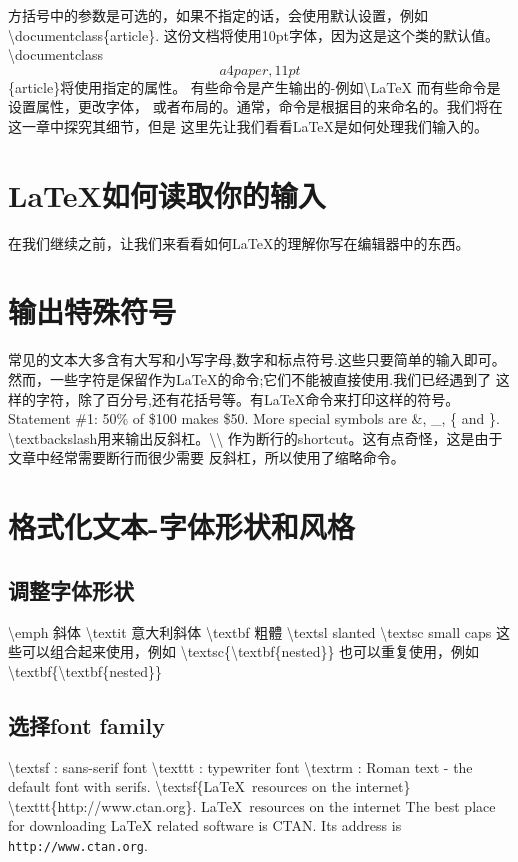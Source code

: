 方括号中的参数是可选的，如果不指定的话，会使用默认设置，例如\textbackslash documentclass\{article\}.
这份文档将使用10pt字体，因为这是这个类的默认值。
\textbackslash documentclass\[a4paper,11pt\]\{article\}将使用指定的属性。
有些命令是产生输出的-例如\textbackslash LaTeX 而有些命令是设置属性，更改字体，
或者布局的。通常，命令是根据目的来命名的。我们将在这一章中探究其细节，但是
这里先让我们看看LaTeX是如何处理我们输入的。
	\section{LaTeX如何读取你的输入}
在我们继续之前，让我们来看看如何LaTeX的理解你写在编辑器中的东西。
	\section{输出特殊符号}
常见的文本大多含有大写和小写字母,数字和标点符号.这些只要简单的输入即可。
然而，一些字符是保留作为LaTeX的命令;它们不能被直接使用.我们已经遇到了
这样的字符，除了百分号,还有花括号等。有LaTeX命令来打印这样的符号。
Statement \#1:
50\% of \$100 makes \$50.
More special symbols are \&, \_, \{ and \}.
\textbackslash textbackslash用来输出反斜杠。\textbackslash\textbackslash
作为断行的shortcut。这有点奇怪，这是由于文章中经常需要断行而很少需要
反斜杠，所以使用了缩略命令。
\section{格式化文本-字体形状和风格}
	\subsection{调整字体形状}
	\textbackslash emph 斜体
	\textbackslash textit 意大利斜体
	\textbackslash textbf 粗體
	\textbackslash textsl slanted
	\textbackslash textsc small caps
这些可以组合起来使用，例如 \textbackslash textsc\{\textbackslash textbf\{nested\}\}
也可以重复使用，例如\textbackslash textbf\{\textbackslash textbf\{nested\}\}
	\subsection{选择font family}
	\textbackslash textsf : sans-serif font
	\textbackslash texttt : typewriter font
	\textbackslash textrm : Roman text - the default font with serifs.
\textbackslash textsf\{LaTeX\ resources on the internet\}
\textbackslash texttt\{http://www.ctan.org\}.
\textsf{LaTeX\ resources on the internet}
The best place for downloading LaTeX related software is CTAN.
Its address is \texttt{http://www.ctan.org}.
